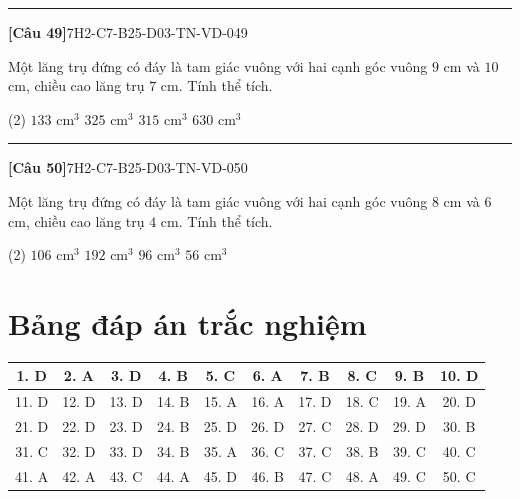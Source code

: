\documentclass[12pt,a4paper]{article}
\newif\ifloigiai
\newenvironment{cauhoi}[2]{%
  \par\medskip\noindent\rule{\textwidth}{0.4pt}\par\nopagebreak
  \noindent\textbf{[#1]}\hfill{\scriptsize\ttfamily #2}\par\nopagebreak\smallskip}{\par}
\newcommand{\dapan}[1]{\ifloigiai\par\smallskip\noindent\textit{Đáp án:} \textbf{#1}\par\fi}
\begin{document}
\begin{cauhoi}{Câu 49}{7H2-C7-B25-D03-TN-VD-049}
Một lăng trụ đứng có đáy là tam giác vuông với hai cạnh góc vuông $9$ cm và $10$ cm, chiều cao lăng trụ $7$ cm. Tính thể tích.
\begin{tasks}(2)
\task $133\text{ cm}^3$
\task $325\text{ cm}^3$
\task $315\text{ cm}^3$
\task $630\text{ cm}^3$
\end{tasks}
\dapan{C}
\end{cauhoi}
\begin{cauhoi}{Câu 50}{7H2-C7-B25-D03-TN-VD-050}
Một lăng trụ đứng có đáy là tam giác vuông với hai cạnh góc vuông $8$ cm và $6$ cm, chiều cao lăng trụ $4$ cm. Tính thể tích.
\begin{tasks}(2)
\task $106\text{ cm}^3$
\task $192\text{ cm}^3$
\task $96\text{ cm}^3$
\task $56\text{ cm}^3$
\end{tasks}
\dapan{C}
\end{cauhoi}
\clearpage\section*{Bảng đáp án trắc nghiệm}
\begin{center}\begin{tabular}{|c|c|c|c|c|c|c|c|c|c|}
\hline
1. D & 2. A & 3. D & 4. B & 5. C & 6. A & 7. B & 8. C & 9. B & 10. D\\\hline
11. D & 12. D & 13. D & 14. B & 15. A & 16. A & 17. D & 18. C & 19. A & 20. D\\\hline
21. D & 22. D & 23. D & 24. B & 25. D & 26. D & 27. C & 28. D & 29. D & 30. B\\\hline
31. C & 32. D & 33. D & 34. B & 35. A & 36. C & 37. C & 38. B & 39. C & 40. C\\\hline
41. A & 42. A & 43. C & 44. A & 45. D & 46. B & 47. C & 48. A & 49. C & 50. C\\\hline
\end{tabular}\end{center}
\end{document}
